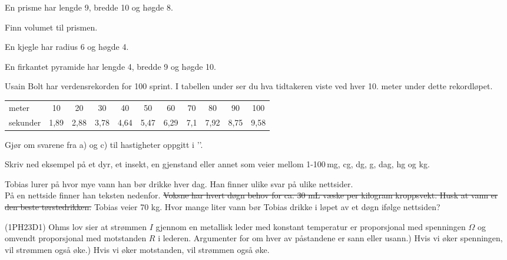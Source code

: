 \nes


En prisme har lengde 9, bredde 10 og høgde 8.\os

Finn volumet til prismen.


En kjegle har radius 6 og høgde 4.

En firkantet pyramide har lengde 4, bredde 9 og høgde 10.

\nes

Usain Bolt har verdensrekorden for 100 sprint. I tabellen under ser du hva tidtakeren viste ved hver 10. meter under dette rekordløpet. \vs
\begin{center}\small
	\begin{tabular}{l|c|c|c|c|c|c|c|c|c|c}
meter & 10 & 20 & 30 & 40 & 50 & 60 & 70 & 80 & 90 & 100\\
sekunder& 1,89 & 2,88 & 3,78 & 4,64 & 5,47 & 6,29 & 7,1 & 7,92 & 8,75 & 9,58
\end{tabular}
\end{center}
\newpage
\nes
{}
Gjør om svarene fra  a) og c) til hastigheter oppgitt i ''. 

Skriv ned eksempel på et dyr, et insekt, en gjenstand eller annet som veier mellom 1-100\,mg, cg, dg, g, dag, hg og kg.

Tobias lurer på hvor mye vann han bør drikke hver dag.\os
Han finner ulike svar på ulike nettsider.\\
På en nettside finner han teksten nedenfor.
\st{
Voksne har hvert døgn behov for ca. 30 mL væske per kilogram kroppsvekt.
Husk at vann er den beste tørstedrikken.
}
Tobias veier 70 kg. \os
Hvor mange liter vann bør Tobias drikke i løpet av et døgn ifølge nettsiden?

 (1PH23D1) \os
Ohms lov sier at strømmen $ I $ gjennom en metallisk leder med konstant temperatur
er proporsjonal med spenningen $ \Omega $ og omvendt proporsjonal med motstanden $ R $ i lederen.\os
Argumenter for om hver av påstandene er sann eller usann.) Hvis vi øker spenningen, vil strømmen også øke.) Hvis vi øker motstanden, vil strømmen også øke.



